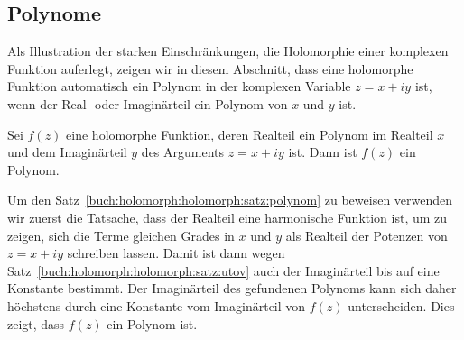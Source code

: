 %
%
\subsection{Polynome}
Als Illustration der starken Einschränkungen, die Holomorphie einer
komplexen Funktion auferlegt, zeigen wir in diesem Abschnitt,
dass eine holomorphe Funktion automatisch ein Polynom in der
komplexen Variable $z=x+iy$ ist,
wenn der Real- oder Imaginärteil ein Polynom von $x$ und $y$ ist.

\begin{satz}
\label{buch:holomorph:holomorph:satz:polynom}
Sei $f(z)$ eine holomorphe Funktion, deren Realteil ein Polynom
im Realteil $x$ und dem Imaginärteil $y$ des Arguments $z=x+iy$ ist.
Dann ist $f(z)$ ein Polynom.
\end{satz}

Um den Satz~\ref{buch:holomorph:holomorph:satz:polynom}
zu beweisen verwenden wir zuerst die Tatsache, dass der Realteil
eine harmonische Funktion ist, um zu zeigen, sich die Terme gleichen
Grades in $x$ und $y$ als Realteil der Potenzen von $z=x+iy$ schreiben
lassen.
Damit ist dann wegen Satz~\ref{buch:holomorph:holomorph:satz:utov}
auch der Imaginärteil bis auf eine Konstante bestimmt.
Der Imaginärteil des gefundenen Polynoms kann sich daher höchstens
durch eine Konstante vom Imaginärteil von $f(z)$ unterscheiden.
Dies zeigt, dass $f(z)$ ein Polynom ist.

